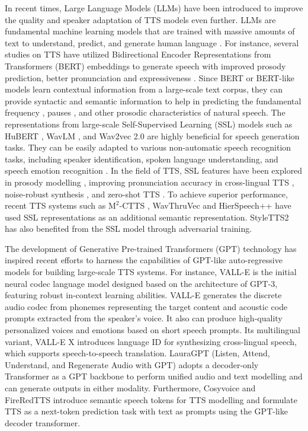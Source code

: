 In recent times, Large Language Models (LLMs) have been introduced to improve the quality and speaker adaptation of TTS models even further. LLMs are fundamental machine learning models that are trained with massive amounts of text to understand, predict, and generate human language \cite {surveyllm}. 
For instance, several studies on TTS have utilized Bidirectional Encoder Representations from Transformers (BERT) embeddings to generate speech with improved prosody prediction, better pronunciation and expressiveness \cite{chen2021, kenter2020, xiao2020, xu2021}. Since BERT or BERT-like models learn contextual information from a large-scale text corpus, they can provide syntactic and semantic information to help in predicting the fundamental frequency \cite{yasuda2022}, pauses \cite{xiao2020}, and other prosodic characteristics \cite{moya2023a} of natural speech. The representations from large-scale Self-Supervised Learning (SSL) models such as HuBERT \cite{hsu2021hubert}, WavLM \cite{chen2022wavlm}, and Wav2vec 2.0 \cite{baevski2020wav2vec} are highly beneficial for speech generation tasks. They can be easily adapted to various non-automatic speech recognition tasks, including speaker identification, spoken language understanding, and speech emotion recognition \cite{ftwav2vec}. In the field of TTS, SSL features have been explored in prosody modelling \cite{zhang2023}, improving pronunciation accuracy in cross-lingual TTS \cite{cong2022}, noise-robust synthesis \cite{Siuzdak2022}, and zero-shot TTS \cite{hierspeech,fujita2023}. To achieve superior performance, recent TTS systems such as $\text{M}^{2}$-CTTS \cite{xue2023}, WavThruVec \cite{siuzdak22} and HierSpeech++ \cite{hierspeech} have used SSL representations as an additional semantic representation. StyleTTS2 \cite{styletts2} has also benefited from the SSL model through adversarial training.

The development of Generative Pre-trained Transformers (GPT) technology \cite{gpt} has inspired recent efforts to harness the capabilities of GPT-like auto-regressive models for building large-scale TTS systems. For instance, VALL-E \cite{valle} is the initial neural codec language model designed based on the architecture of GPT-3, featuring robust in-context learning abilities. VALL-E generates the discrete audio codec from phonemes representing the target content and acoustic code prompts extracted from the speaker's voice. It also can produce high-quality personalized voices and emotions based on short speech prompts. Its multilingual variant, VALL-E X \cite{vallex} introduces language ID for synthesizing cross-lingual speech, which supports speech-to-speech translation. LauraGPT (Listen, Attend, Understand, and Regenerate Audio with GPT) \cite{lauratts} adopts a decoder-only Transformer as a GPT backbone to perform unified audio and text modelling and can generate outputs in either modality. Furthermore, Cosyvoice \cite{cosyvoice} and FireRedTTS \cite{fireredtts} introduce semantic speech tokens for TTS modelling and formulate TTS as a next-token prediction task with text as prompts using the GPT-like decoder transformer.

